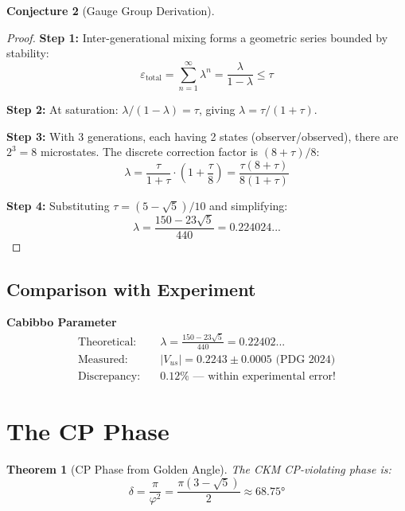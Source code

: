 \documentclass[11pt,a4paper]{article}
\theoremstyle{plain}
\newtheorem{theorem}{Theorem}[section]
\theoremstyle{definition}
\newtheorem{conjecture}[theorem]{Conjecture}
\theoremstyle{remark}
\begin{document}
\begin{conjecture}[Gauge Group Derivation]
\begin{proof}
\textbf{Step 1:} Inter-generational mixing forms a geometric series bounded by stability:
\begin{equation}
\varepsilon_{\text{total}} = \sum_{n=1}^{\infty} \lambda^n = \frac{\lambda}{1-\lambda} \leq \tau
\end{equation}

\textbf{Step 2:} At saturation: $\lambda/(1-\lambda) = \tau$, giving $\lambda = \tau/(1+\tau)$.

\textbf{Step 3:} With 3 generations, each having 2 states (observer/observed), there are $2^3 = 8$ microstates. The discrete correction factor is $(8+\tau)/8$:
\begin{equation}
\lambda = \frac{\tau}{1+\tau} \cdot \left(1 + \frac{\tau}{8}\right) = \frac{\tau(8+\tau)}{8(1+\tau)}
\end{equation}

\textbf{Step 4:} Substituting $\tau = (5-\sqrt{5})/10$ and simplifying:
\begin{equation}
\lambda = \frac{150 - 23\sqrt{5}}{440} = 0.224024...
\end{equation}
\end{proof}

\subsection{Comparison with Experiment}

\begin{derivedconstant}
\textbf{Cabibbo Parameter}
\begin{align*}
\text{Theoretical:} \quad & \lambda = \frac{150 - 23\sqrt{5}}{440} = 0.22402... \\
\text{Measured:} \quad & |V_{us}| = 0.2243 \pm 0.0005 \text{ (PDG 2024)} \\
\text{Discrepancy:} \quad & \mathbf{0.12\%} \text{ --- within experimental error!}
\end{align*}
\end{derivedconstant}

\section{The CP Phase}

\begin{theorem}[CP Phase from Golden Angle]
The CKM CP-violating phase is:
\begin{equation}
\boxed{\delta = \frac{\pi}{\varphi^2} = \frac{\pi(3-\sqrt{5})}{2} \approx 68.75°}
\end{equation}
\end{theorem}


\end{conjecture}
\end{document}

